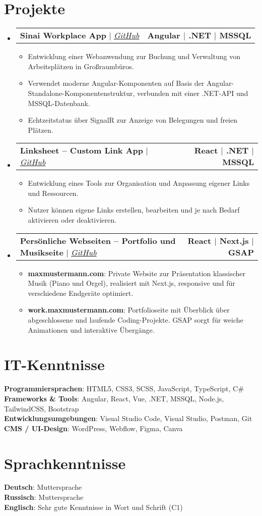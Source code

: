 \documentclass[letterpaper,11pt]{article}
\makeatletter
\newcommand{\resumeItem}[1]{
  \item\small{
    {#1 \vspace{0pt}}
  }
}
\newcommand{\resumeProjectHeading}[2]{
  \item
  \begin{tabular*}{1.001\textwidth}{l@{\extracolsep{\fill}}r}
    \small#1 & \textbf{\small #2} \\
  \end{tabular*}\vspace{-7pt}
}
\newcommand{\resumeSubHeadingListStart}{\begin{itemize}[leftmargin=0.0in, label={}]}
\newcommand{\resumeSubHeadingListEnd}{\end{itemize}\vspace{0pt}}
\newcommand{\resumeItemListStart}{\begin{itemize}}
\newcommand{\resumeItemListEnd}{\end{itemize}\vspace{-5pt}}
\makeatother
\begin{document}
\section{Projekte}
\resumeSubHeadingListStart

  \resumeProjectHeading{\textbf{Sinai Workplace App} $|$ \emph{\href{https://github.com/maxmustermann}{GitHub}}}{Angular $|$ .NET $|$ MSSQL}
  \resumeItemListStart
    \resumeItem{Entwicklung einer Webanwendung zur Buchung und Verwaltung von Arbeitsplätzen in Großraumbüros.}
    \resumeItem{Verwendet moderne Angular-Komponenten auf Basis der Angular-Standalone-Komponentenstruktur, verbunden mit einer .NET-API und MSSQL-Datenbank.}
    \resumeItem{Echtzeitstatus über SignalR zur Anzeige von Belegungen und freien Plätzen.}
  \resumeItemListEnd

  \resumeProjectHeading{\textbf{Linksheet – Custom Link App} $|$ \emph{\href{https://github.com/maxmustermann}{GitHub}}}{React $|$ .NET $|$ MSSQL}
  \resumeItemListStart
    \resumeItem{Entwicklung eines Tools zur Organisation und Anpassung eigener Links und Ressourcen.}
    \resumeItem{Nutzer können eigene Links erstellen, bearbeiten und je nach Bedarf aktivieren oder deaktivieren.}
  \resumeItemListEnd

  \resumeProjectHeading{\textbf{Persönliche Webseiten – Portfolio und Musikseite}  $|$ \emph{\href{https://github.com/maxmustermann}{GitHub}}}{React $|$ Next.js $|$ GSAP}
  \resumeItemListStart
    \resumeItem{\textbf{maxmustermann.com}: Private Website zur Präsentation klassischer Musik (Piano und Orgel), realisiert mit Next.js, responsive und für verschiedene Endgeräte optimiert.}
    \resumeItem{\textbf{work.maxmustermann.com}: Portfolioseite mit Überblick über abgeschlossene und laufende Coding-Projekte. GSAP sorgt für weiche Animationen und interaktive Übergänge.}
  \resumeItemListEnd

\resumeSubHeadingListEnd

\section{IT-Kenntnisse}
\begin{itemize}[leftmargin=0.15in, label={}]\small{\item{
  \textbf{Programmiersprachen}{: HTML5, CSS3, SCSS, JavaScript, TypeScript, C\#} \\[1mm]
  \textbf{Frameworks \& Tools}{: Angular, React, Vue, .NET, MSSQL, Node.js, TailwindCSS, Bootstrap} \\[1mm]
  \textbf{Entwicklungsumgebungen}{: Visual Studio Code, Visual Studio, Postman, Git} \\[1mm]
  \textbf{CMS / UI-Design}{: WordPress, Webflow, Figma, Canva}
}}\end{itemize}

\section{Sprachkenntnisse}
\begin{itemize}[leftmargin=0.15in, label={}]\small{\item{
  \textbf{Deutsch}{: Muttersprache} \\[1mm]
  \textbf{Russisch}{: Muttersprache} \\[1mm]
  \textbf{Englisch}{: Sehr gute Kenntnisse in Wort und Schrift (C1)} \\[1mm]
}}\end{itemize}
\end{document}
